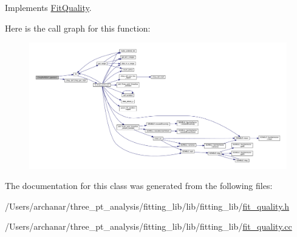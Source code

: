 Implements \mbox{\hyperlink{classFitQuality_a49a49e1206709d71c3ead41e981bb848}{Fit\+Quality}}.

Here is the call graph for this function\+:
\nopagebreak
\begin{figure}[H]
\begin{center}
\leavevmode
\includegraphics[width=350pt]{d8/d8c/classChisqPerNDoF_a4d45c53a895115c4fe318d22c44228e4_cgraph}
\end{center}
\end{figure}


The documentation for this class was generated from the following files\+:\begin{DoxyCompactItemize}
\item 
/\+Users/archanar/three\+\_\+pt\+\_\+analysis/fitting\+\_\+lib/lib/fitting\+\_\+lib/\mbox{\hyperlink{lib_2fitting__lib_2fit__quality_8h}{fit\+\_\+quality.\+h}}\item 
/\+Users/archanar/three\+\_\+pt\+\_\+analysis/fitting\+\_\+lib/lib/fitting\+\_\+lib/\mbox{\hyperlink{fit__quality_8cc}{fit\+\_\+quality.\+cc}}\end{DoxyCompactItemize}
